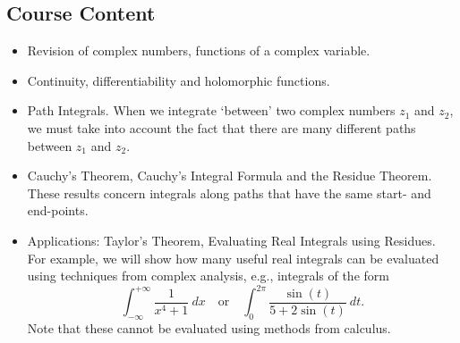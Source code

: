 \subsection*{Course Content}
\begin{itemize}
\item Revision of complex numbers, functions of a complex variable.
\item Continuity, differentiability and holomorphic functions.
\item Path Integrals.  When we integrate `between' two complex numbers $z_1$ and $z_2$, we must take into account the fact that there are many different paths between $z_1$ and $z_2$.
\item Cauchy's Theorem, Cauchy's Integral Formula and the Residue Theorem.  These results concern integrals along paths that have the same start- and end-points.
\item Applications: Taylor's Theorem, Evaluating Real Integrals using Residues.  For example, we will show how many useful real integrals can be evaluated using techniques from complex analysis, e.g., integrals of the form
\[
\int_{-\infty}^{+\infty} \frac{1}{x^4+1}\ dx \quad\text{or}\quad \int_0^{2\pi} \frac{\sin(t)}{5+2\sin(t)}\ dt.
\]
Note that these cannot be evaluated using methods from calculus.
\end{itemize}
